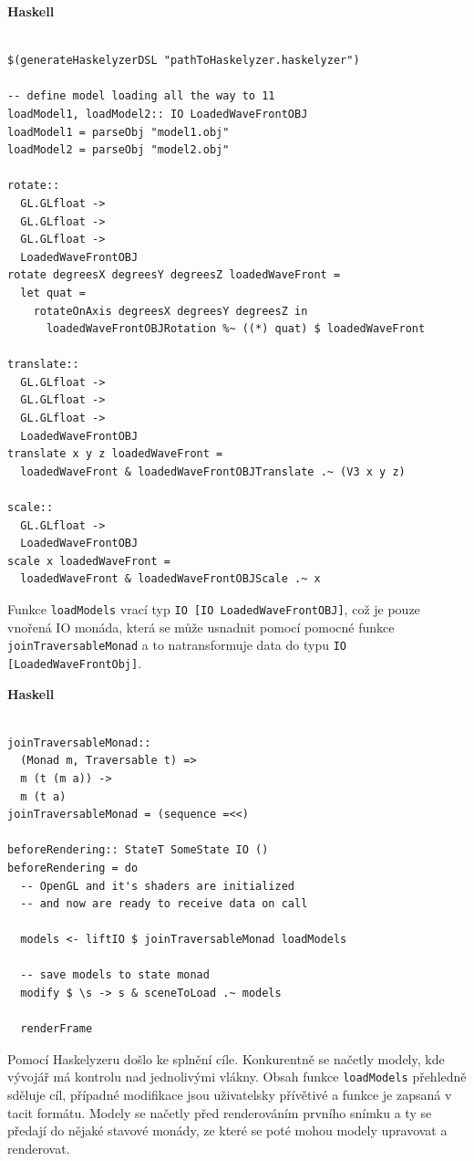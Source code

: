 \documentclass[male,czech]{kithesis}
\newcommand{\haskellInline}[1]{\colorbox{gray!10}{\texttt{#1}}}
\begin{document}
\textbf{Haskell}
\begin{verbatim}

$(generateHaskelyzerDSL "pathToHaskelyzer.haskelyzer")

-- define model loading all the way to 11
loadModel1, loadModel2:: IO LoadedWaveFrontOBJ
loadModel1 = parseObj "model1.obj"
loadModel2 = parseObj "model2.obj"

rotate:: 
  GL.GLfloat -> 
  GL.GLfloat -> 
  GL.GLfloat -> 
  LoadedWaveFrontOBJ
rotate degreesX degreesY degreesZ loadedWaveFront = 
  let quat = 
    rotateOnAxis degreesX degreesY degreesZ in 
      loadedWaveFrontOBJRotation %~ ((*) quat) $ loadedWaveFront 

translate:: 
  GL.GLfloat -> 
  GL.GLfloat -> 
  GL.GLfloat -> 
  LoadedWaveFrontOBJ
translate x y z loadedWaveFront = 
  loadedWaveFront & loadedWaveFrontOBJTranslate .~ (V3 x y z)
      
scale:: 
  GL.GLfloat -> 
  LoadedWaveFrontOBJ
scale x loadedWaveFront = 
  loadedWaveFront & loadedWaveFrontOBJScale .~ x

\end{verbatim}

Funkce \haskellInline{loadModels} vrací typ \haskellInline{IO [IO LoadedWaveFrontOBJ]},
což je pouze vnořená IO monáda, 
která se může usnadnit pomocí pomocné funkce \haskellInline{joinTraversableMonad} a 
to natransformuje data do typu \haskellInline{IO [LoadedWaveFrontObj]}.

\textbf{Haskell}
\begin{verbatim}

joinTraversableMonad:: 
  (Monad m, Traversable t) => 
  m (t (m a)) -> 
  m (t a)
joinTraversableMonad = (sequence =<<)

beforeRendering:: StateT SomeState IO ()
beforeRendering = do
  -- OpenGL and it's shaders are initialized 
  -- and now are ready to receive data on call

  models <- liftIO $ joinTraversableMonad loadModels 

  -- save models to state monad
  modify $ \s -> s & sceneToLoad .~ models

  renderFrame

\end{verbatim}

Pomocí Haskelyzeru došlo ke splnění cíle.
Konkurentně se načetly modely, 
kde vývojář má kontrolu nad jednolivými vlákny.
Obsah funkce \haskellInline{loadModels} přehledně sděluje cíl,  
případné modifikace jsou uživatelsky přívětivé a 
funkce je zapsaná v tacit formátu.
Modely se načetly před renderováním prvního snímku a 
ty se předají do nějaké stavové monády, 
ze které se poté mohou modely upravovat a renderovat.
\end{document}
